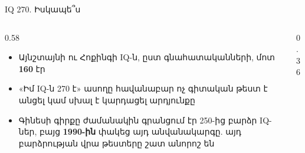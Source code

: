 \begin{frame}{IQ 270. Իսկապե՞ս}
  \begin{columns}[c]
    \begin{column}{0.58\textwidth}
      \begin{itemize}
        \item Այնշտայնի ու Հոքինգի IQ-ն, ըստ գնահատականների, մոտ \textbf{160} էր
        \item<2-> «Իմ IQ-ն 270 է» ասողը հավանաբար ոչ գիտական թեստ է անցել կամ սխալ է կարդացել արդյունքը
        \item<3-> Գինեսի գիրքը ժամանակին գրանցում էր 250-ից բարձր IQ-ներ, բայց \textbf{1990-ին} փակեց այդ անվանակարգը. այդ բարձրության վրա թեստերը շատ անորոշ են
      \end{itemize}
    \end{column}
    \begin{column}{0.36\textwidth}
      \centering
      \par\medskip
    \end{column}
  \end{columns}
\end{frame}

